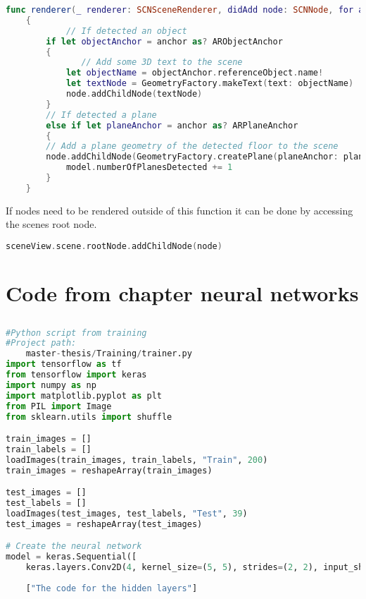 \begin{appendices}
\begin{lstlisting}[language=swift]
func renderer(_ renderer: SCNSceneRenderer, didAdd node: SCNNode, for anchor: ARAnchor)
    {
    	    // If detected an object
        if let objectAnchor = anchor as? ARObjectAnchor
        {
        	   // Add some 3D text to the scene
            let objectName = objectAnchor.referenceObject.name!
            let textNode = GeometryFactory.makeText(text: objectName)
            node.addChildNode(textNode)
        }
        // If detected a plane
        else if let planeAnchor = anchor as? ARPlaneAnchor
        {
        // Add a plane geometry of the detected floor to the scene
        node.addChildNode(GeometryFactory.createPlane(planeAnchor: planeAnchor, metalDevice: metalDevice!))
            model.numberOfPlanesDetected += 1
        }
    }
\end{lstlisting}

If nodes need to be rendered outside of this function it can be done by accessing the
scenes root node.

\begin{lstlisting}[language=swift]
sceneView.scene.rootNode.addChildNode(node)
\end{lstlisting}

\chapter{Code from chapter neural networks}
\section{}
\begin{lstlisting}[language=python]
#Python script from training
#Project path:
	master-thesis/Training/trainer.py
import tensorflow as tf
from tensorflow import keras
import numpy as np
import matplotlib.pyplot as plt
from PIL import Image
from sklearn.utils import shuffle

train_images = []
train_labels = []
loadImages(train_images, train_labels, "Train", 200)
train_images = reshapeArray(train_images)

test_images = []
test_labels = []
loadImages(test_images, test_labels, "Test", 39)
test_images = reshapeArray(test_images)

# Create the neural network
model = keras.Sequential([
	keras.layers.Conv2D(4, kernel_size=(5, 5), strides=(2, 2), input_shape=(image_height, image_width, number_of_color_channels)),
		
	["The code for the hidden layers"]


\end{lstlisting}
\end{appendices}
